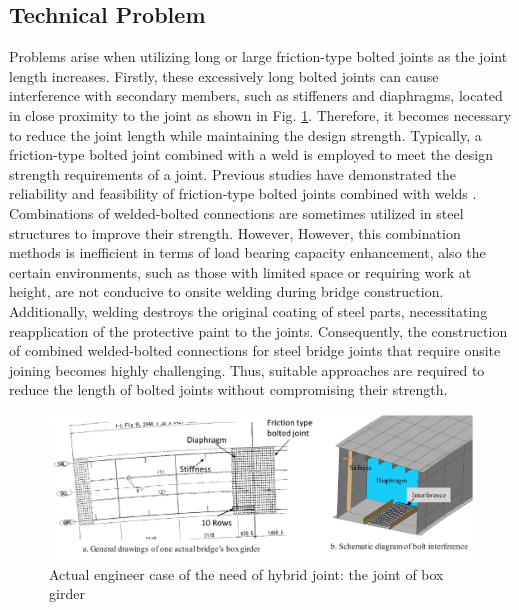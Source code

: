 \subsection{Technical Problem} %
Problems arise when utilizing long or large friction-type bolted joints as the joint length increases. Firstly, these excessively long bolted joints can cause interference with secondary members, such as stiffeners and diaphragms, located in close proximity to the joint as shown in Fig. \ref{fig-boxhsbinter}. Therefore, it becomes necessary to reduce the joint length while maintaining the design strength. Typically, a friction-type bolted joint combined with a weld is employed to meet the design strength requirements of a joint. Previous studies have demonstrated the reliability and feasibility of friction-type bolted joints combined with welds \cite{solodov2021,Thomas2000,Chang2019361,KHANDEL2022107036}. Combinations of welded-bolted connections are sometimes utilized in steel structures to improve their strength. However, However, this combination methods is inefficient in terms of load bearing capacity enhancement, also the certain environments, such as those with limited space or requiring work at height, are not conducive to onsite welding during bridge construction. Additionally, welding destroys the original coating of steel parts, necessitating reapplication of the protective paint to the joints. Consequently, the construction of combined welded-bolted connections for steel bridge joints that require onsite joining becomes highly challenging. Thus, suitable approaches are required to reduce the length of bolted joints without compromising their strength.

\begin{figure}[htbp]
    \centering
    \includegraphics[width=1\linewidth]{imgs//ch2/boxhsbinter.pdf}
    \caption{Actual engineer case of the need of hybrid joint: the joint of box girder}
    \label{fig-boxhsbinter}
\end{figure}

